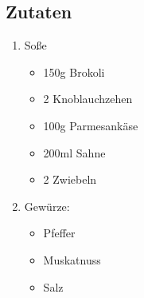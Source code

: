     \subsection*{Zutaten}
      \begin{enumerate}
        \item Soße
        \begin{itemize}
          \item 150g Brokoli
          \item 2 Knoblauchzehen
          \item 100g Parmesankäse
          \item 200ml Sahne
          \item 2 Zwiebeln
        \end{itemize}
        \item Gewürze:
        \begin{itemize}
          \item Pfeffer
          \item Muskatnuss
          \item Salz
        \end{itemize}
      \end{enumerate}


